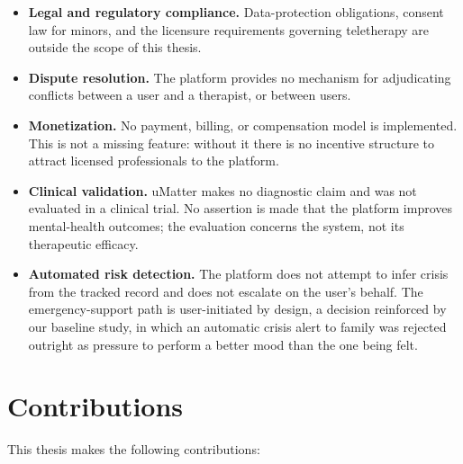 \begin{itemize}
  \item \textbf{Legal and regulatory compliance.} Data-protection obligations,
    consent law for minors, and the licensure requirements governing
    teletherapy are outside the scope of this thesis. 

  \item \textbf{Dispute resolution.} The platform provides no mechanism for
    adjudicating conflicts between a user and a therapist, or between users.

  \item \textbf{Monetization.} No payment, billing, or compensation model is
    implemented. This is not a missing feature: without it there is no
    incentive structure to attract licensed professionals to the platform.

  \item \textbf{Clinical validation.} uMatter makes no diagnostic claim and was
    not evaluated in a clinical trial. No assertion is made that the platform
    improves mental-health outcomes; the evaluation concerns the system, not its
    therapeutic efficacy.

  \item \textbf{Automated risk detection.} The platform does not attempt to
    infer crisis from the tracked record and does not escalate on the user's
    behalf. The emergency-support path is user-initiated by design, a
    decision reinforced by our baseline study, in which an automatic crisis
    alert to family was rejected outright as pressure to perform a better mood
    than the one being felt. 


\end{itemize}

\section{Contributions}

This thesis makes the following contributions:

